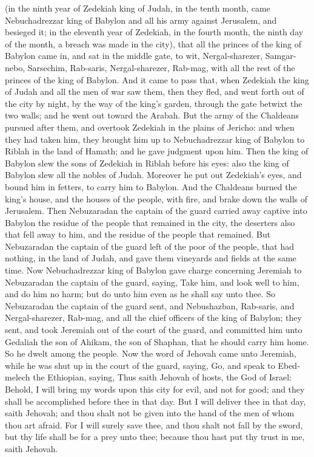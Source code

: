 (in the ninth year of Zedekiah king of Judah, in the tenth month, came Nebuchadrezzar king of Babylon and all his army against Jerusalem, and besieged it; in the eleventh year of Zedekiah, in the fourth month, the ninth day of the month, a breach was made in the city), that all the princes of the king of Babylon came in, and sat in the middle gate, to wit, Nergal-sharezer, Samgar-nebo, Sarsechim, Rab-saris, Nergal-sharezer, Rab-mag, with all the rest of the princes of the king of Babylon.  And it came to pass that, when Zedekiah the king of Judah and all the men of war saw them, then they fled, and went forth out of the city by night, by the way of the king’s garden, through the gate betwixt the two walls; and he went out toward the Arabah. But the army of the Chaldeans pursued after them, and overtook Zedekiah in the plains of Jericho: and when they had taken him, they brought him up to Nebuchadrezzar king of Babylon to Riblah in the land of Hamath; and he gave judgment upon him. Then the king of Babylon slew the sons of Zedekiah in Riblah before his eyes: also the king of Babylon slew all the nobles of Judah. Moreover he put out Zedekiah’s eyes, and bound him in fetters, to carry him to Babylon. And the Chaldeans burned the king’s house, and the houses of the people, with fire, and brake down the walls of Jerusalem. Then Nebuzaradan the captain of the guard carried away captive into Babylon the residue of the people that remained in the city, the deserters also that fell away to him, and the residue of the people that remained. But Nebuzaradan the captain of the guard left of the poor of the people, that had nothing, in the land of Judah, and gave them vineyards and fields at the same time.  Now Nebuchadrezzar king of Babylon gave charge concerning Jeremiah to Nebuzaradan the captain of the guard, saying, Take him, and look well to him, and do him no harm; but do unto him even as he shall say unto thee. So Nebuzaradan the captain of the guard sent, and Nebushazban, Rab-saris, and Nergal-sharezer, Rab-mag, and all the chief officers of the king of Babylon; they sent, and took Jeremiah out of the court of the guard, and committed him unto Gedaliah the son of Ahikam, the son of Shaphan, that he should carry him home. So he dwelt among the people.  Now the word of Jehovah came unto Jeremiah, while he was shut up in the court of the guard, saying, Go, and speak to Ebed-melech the Ethiopian, saying, Thus saith Jehovah of hosts, the God of Israel: Behold, I will bring my words upon this city for evil, and not for good; and they shall be accomplished before thee in that day. But I will deliver thee in that day, saith Jehovah; and thou shalt not be given into the hand of the men of whom thou art afraid. For I will surely save thee, and thou shalt not fall by the sword, but thy life shall be for a prey unto thee; because thou hast put thy trust in me, saith Jehovah. 

